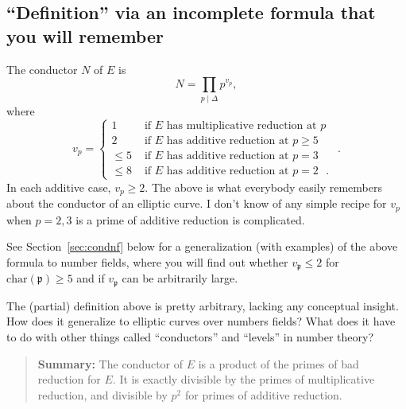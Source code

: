 \documentclass{book}
\begin{document}
\subsection{``Definition'' via an incomplete formula that you will remember}
The conductor $N$ of $E$ is
$$
N = \prod_{p\mid\Delta} p^{v_p},
$$
where
$$
v_p = \begin{cases}
 1 & \text{ if $E$ has multiplicative reduction at $p$ } \\
 2 & \text{ if $E$ has additive reduction at $p\geq 5$ } \\
 \leq 5 & \text{ if $E$ has additive reduction at $p=3$ }\\
 \leq 8 & \text{ if $E$ has additive reduction at $p=2$ }.
 \end{cases}.
$$
In each additive case, $v_p\geq 2$.
The above is what everybody easily remembers about the conductor
of an elliptic curve.  I don't know of any simple
recipe for $v_p$ when $p=2,3$ is
a prime of additive reduction is complicated.

\begin{remark}
See Section~\ref{sec:condnf} below for a generalization (with
examples) of the above formula to number fields, where you will
find out whether
$v_\mathfrak{p}\leq 2$ for $\text{char}(\mathfrak{p})\geq 5$
and if $v_\mathfrak{p}$ can be arbitrarily large.
\end{remark}

The (partial) definition above is pretty arbitrary, lacking any
conceptual insight.   How does it generalize to elliptic curves
over numbers fields?  What does it have to do
with other things called ``conductors'' and ``levels''
in number theory?


\begin{quote}
{\bf Summary:} The conductor of $E$ is a product of the primes of bad
reduction for $E$.  It is exactly divisible by the primes of multiplicative
reduction, and divisible by $p^2$ for primes of additive reduction.
\end{quote}
\end{document}
